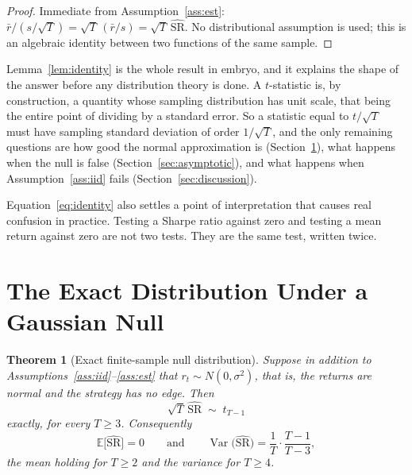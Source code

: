 \documentclass[11pt]{article}
\newtheorem{theorem}{Theorem}
\theoremstyle{remark}
\theoremstyle{definition}
\newcommand{\SRhat}{\widehat{\text{SR}}}
\begin{document}
\begin{proof}
Immediate from Assumption~\ref{ass:est}: $\bar r/(s/\sqrt{T}) = \sqrt{T}\,(\bar r/s) = \sqrt{T}\,\SRhat$. No distributional assumption is used; this is an algebraic identity between two functions of the same sample.
\end{proof}

Lemma~\ref{lem:identity} is the whole result in embryo, and it explains the shape of the answer before any distribution theory is done. A $t$-statistic is, by construction, a quantity whose sampling distribution has unit scale, that being the entire point of dividing by a standard error. So a statistic equal to $t/\sqrt{T}$ must have sampling standard deviation of order $1/\sqrt{T}$, and the only remaining questions are how good the normal approximation is (Section~\ref{sec:exact}), what happens when the null is false (Section~\ref{sec:asymptotic}), and what happens when Assumption~\ref{ass:iid} fails (Section~\ref{sec:discussion}).

Equation~\eqref{eq:identity} also settles a point of interpretation that causes real confusion in practice. Testing a Sharpe ratio against zero and testing a mean return against zero are not two tests. They are the same test, written twice.

\section{The Exact Distribution Under a Gaussian Null}
\label{sec:exact}

\begin{theorem}[Exact finite-sample null distribution]
\label{thm:exact}
Suppose in addition to Assumptions~\ref{ass:iid}--\ref{ass:est} that $r_t \sim N(0,\sigma^2)$, that is, the returns are normal and the strategy has no edge. Then
\begin{equation}
\label{eq:exactt}
\sqrt{T}\,\SRhat \;\sim\; t_{T-1}
\end{equation}
exactly, for every $T \ge 3$. Consequently
\begin{equation}
\label{eq:exactmoments}
\mathbb{E}\big[\SRhat\big] = 0
\qquad\text{and}\qquad
\operatorname{Var}\big(\SRhat\big) = \frac{1}{T}\cdot\frac{T-1}{T-3},
\end{equation}
the mean holding for $T \ge 2$ and the variance for $T \ge 4$.
\end{theorem}
\end{document}
